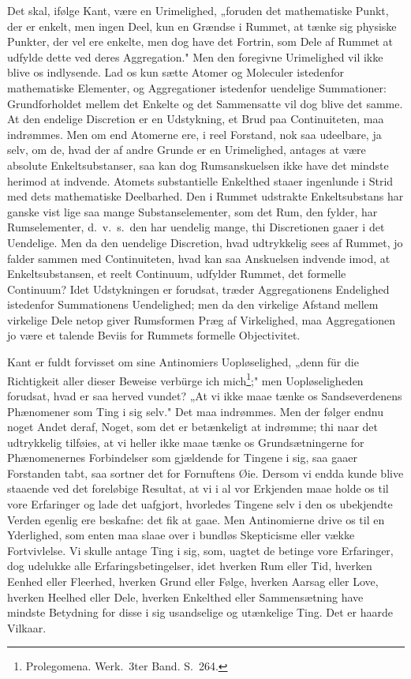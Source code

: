 \documentclass[12pt]{article}
\newcommand{\opage}[1]{\marginnote{\footnotesize\textit{[#1]}}}
\begin{document}
Det skal, ifølge Kant, være en Urimelighed, „foruden det
mathematiske Punkt, der er enkelt, men ingen Deel, kun en Grændse
i Rummet, at tænke sig physiske Punkter, der vel ere enkelte,
men dog have det Fortrin, som Dele af Rummet at udfylde
dette ved deres Aggregation." Men den foregivne Urimelighed
vil ikke blive os indlysende. Lad os kun sætte Atomer og
Moleculer istedenfor mathematiske Elementer, og Aggregationer
istedenfor uendelige Summationer: Grundforholdet mellem
det Enkelte og det Sammensatte vil dog blive det samme. At
den endelige Discretion er en Udstykning, et Brud paa
Continuiteten, maa indrømmes. Men om end Atomerne ere, i reel
Forstand, nok saa udeelbare, ja selv, om de, hvad der af andre
Grunde er en Urimelighed, antages at være absolute Enkelt\-substanser,
saa kan dog Rumsanskuelsen ikke have det mindste
herimod at indvende. Atomets substantielle Enkelthed staaer
ingenlunde i Strid med dets mathematiske Deelbarhed. Den i
Rummet udstrakte Enkeltsubstans har ganske vist lige saa
mange Substanselementer, som det Rum, den fylder, har Rums\-elementer,
d.\ v.\ s.\ den har uendelig mange, thi Discretionen
\opage{19} gaaer i det Uendelige. Men da den uendelige Discretion, hvad
udtrykkelig sees af Rummet, jo falder sammen med Continuiteten,
hvad kan saa Anskuelsen indvende imod, at Enkeltsubstansen,
et reelt Continuum, udfylder Rummet, det formelle Continuum?
Idet Udstykningen er forudsat, træder Aggregationens
Endelighed istedenfor Summationens Uendelighed; men da den
virkelige Afstand mellem virkelige Dele netop giver Rumsformen
Præg af Virkelighed, maa Aggregationen jo være et talende
Beviis for Rummets formelle Objectivitet.

Kant er fuldt forvisset om sine Antinomiers Uopløselighed,
„denn für die Richtigkeit aller dieser Beweise verbürge ich
mich\footnote{Prolegomena. Werk.\ 3ter Band. S.~264.};" men
Uopløseligheden forudsat, hvad er saa herved vundet? „At vi ikke
maae tænke os Sandseverdenens Phænomener som Ting i sig
selv." Det maa indrømmes. Men der følger endnu noget Andet
deraf, Noget, som det er betænkeligt at indrømme; thi naar det
udtrykkelig tilføies, at vi heller ikke maae tænke os
Grundsætningerne for Phænomenernes Forbindelser som gjældende for
Tingene i sig, saa gaaer Forstanden tabt, saa sortner det for
Fornuftens Øie. Dersom vi endda kunde blive staaende ved det
foreløbige Resultat, at vi i al vor Erkjenden maae holde os til
vore Erfaringer og lade det uafgjort, hvorledes Tingene selv i
den os ubekjendte Verden egenlig ere beskafne: det fik at gaae.
Men Antinomierne drive os til en Yderlighed, som enten maa
slaae over i bundløs Skepticisme eller vække Fortvivlelse. Vi
skulle antage Ting i sig, som, uagtet de betinge vore Erfaringer,
dog udelukke alle Erfaringsbetingelser, idet hverken Rum eller
Tid, hverken Eenhed eller Fleerhed, hverken Grund eller Følge,
hverken Aarsag eller Love, hverken Heelhed eller Dele, hverken
Enkelthed eller Sammensætning have mindste Betydning for
disse i sig usandselige og utænkelige Ting. Det er haarde Vilkaar.
\end{document}
